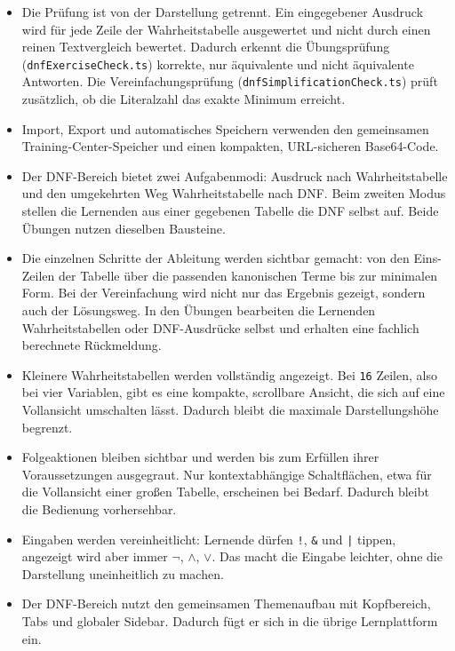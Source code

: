 \begin{itemize}
  \item Die Prüfung ist von der Darstellung getrennt. Ein eingegebener Ausdruck wird für
  jede Zeile der Wahrheitstabelle ausgewertet und nicht durch einen reinen Textvergleich
  bewertet. Dadurch erkennt die Übungsprüfung (\texttt{dnfExerciseCheck.ts}) korrekte,
  nur äquivalente und nicht äquivalente Antworten. Die Vereinfachungsprüfung
  (\texttt{dnfSimplificationCheck.ts}) prüft zusätzlich, ob die Literalzahl das exakte
  Minimum erreicht.

  \item Import, Export und automatisches Speichern verwenden den gemeinsamen
  Training-Center-Speicher und einen kompakten, URL-sicheren Base64-Code.
\end{itemize}


\begin{itemize}
  \item Der DNF-Bereich bietet zwei Aufgabenmodi: \glqq Ausdruck nach
  Wahrheitstabelle\grqq{} und den umgekehrten Weg \glqq Wahrheitstabelle nach DNF\grqq{}.
  Beim zweiten Modus stellen die Lernenden aus einer gegebenen Tabelle die DNF selbst auf.
  Beide Übungen nutzen dieselben Bausteine.

  \item Die einzelnen Schritte der Ableitung werden sichtbar gemacht: von den Eins-Zeilen
  der Tabelle über die passenden kanonischen Terme bis zur minimalen Form. Bei der
  Vereinfachung wird nicht nur das Ergebnis gezeigt, sondern auch der Lösungsweg. In den
  Übungen bearbeiten die Lernenden Wahrheitstabellen oder DNF-Ausdrücke selbst und
  erhalten eine fachlich berechnete Rückmeldung.

  \item Kleinere Wahrheitstabellen werden vollständig angezeigt. Bei \texttt{16} Zeilen,
  also bei vier Variablen, gibt es eine kompakte, scrollbare Ansicht, die sich auf eine
  Vollansicht umschalten lässt. Dadurch bleibt die maximale Darstellungshöhe begrenzt.

  \item Folgeaktionen bleiben sichtbar und werden bis zum Erfüllen ihrer Voraussetzungen
  ausgegraut. Nur kontextabhängige Schaltflächen, etwa für die Vollansicht einer großen
  Tabelle, erscheinen bei Bedarf. Dadurch bleibt die Bedienung vorhersehbar.

  \item Eingaben werden vereinheitlicht: Lernende dürfen \texttt{!}, \texttt{\&} und
  \texttt{|} tippen, angezeigt wird aber immer \(\lnot\), \(\land\), \(\lor\). Das macht die
  Eingabe leichter, ohne die Darstellung uneinheitlich zu machen.

  \item Der DNF-Bereich nutzt den gemeinsamen Themenaufbau mit Kopfbereich, Tabs und
  globaler Sidebar. Dadurch fügt er sich in die übrige Lernplattform ein.
\end{itemize}

